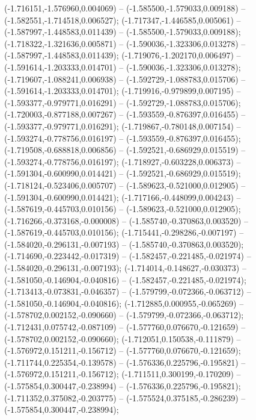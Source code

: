  (-1.716151,-1.576960,0.004069) -- (-1.585500,-1.579033,0.009188) -- (-1.582551,-1.714518,0.006527);
 (-1.717347,-1.446585,0.005061) -- (-1.587997,-1.448583,0.011439) -- (-1.585500,-1.579033,0.009188);
 (-1.718322,-1.321636,0.005871) -- (-1.590036,-1.323306,0.013278) -- (-1.587997,-1.448583,0.011439);
 (-1.719076,-1.202170,0.006497) -- (-1.591614,-1.203333,0.014701) -- (-1.590036,-1.323306,0.013278);
 (-1.719607,-1.088241,0.006938) -- (-1.592729,-1.088783,0.015706) -- (-1.591614,-1.203333,0.014701);
 (-1.719916,-0.979899,0.007195) -- (-1.593377,-0.979771,0.016291) -- (-1.592729,-1.088783,0.015706);
 (-1.720003,-0.877188,0.007267) -- (-1.593559,-0.876397,0.016455) -- (-1.593377,-0.979771,0.016291);
 (-1.719867,-0.780148,0.007154) -- (-1.593274,-0.778756,0.016197) -- (-1.593559,-0.876397,0.016455);
 (-1.719508,-0.688818,0.006856) -- (-1.592521,-0.686929,0.015519) -- (-1.593274,-0.778756,0.016197);
 (-1.718927,-0.603228,0.006373) -- (-1.591304,-0.600990,0.014421) -- (-1.592521,-0.686929,0.015519);
 (-1.718124,-0.523406,0.005707) -- (-1.589623,-0.521000,0.012905) -- (-1.591304,-0.600990,0.014421);
 (-1.717166,-0.448099,0.004243) -- (-1.587619,-0.445703,0.010156) -- (-1.589623,-0.521000,0.012905);
 (-1.716266,-0.373168,-0.000008) -- (-1.585740,-0.370863,0.003520) -- (-1.587619,-0.445703,0.010156);
 (-1.715441,-0.298286,-0.007197) -- (-1.584020,-0.296131,-0.007193) -- (-1.585740,-0.370863,0.003520);
 (-1.714690,-0.223442,-0.017319) -- (-1.582457,-0.221485,-0.021974) -- (-1.584020,-0.296131,-0.007193);
 (-1.714014,-0.148627,-0.030373) -- (-1.581050,-0.146904,-0.040816) -- (-1.582457,-0.221485,-0.021974);
 (-1.713413,-0.073831,-0.046357) -- (-1.579799,-0.072366,-0.063712) -- (-1.581050,-0.146904,-0.040816);
 (-1.712885,0.000955,-0.065269) -- (-1.578702,0.002152,-0.090660) -- (-1.579799,-0.072366,-0.063712);
 (-1.712431,0.075742,-0.087109) -- (-1.577760,0.076670,-0.121659) -- (-1.578702,0.002152,-0.090660);
 (-1.712051,0.150538,-0.111879) -- (-1.576972,0.151211,-0.156712) -- (-1.577760,0.076670,-0.121659);
 (-1.711744,0.225354,-0.139578) -- (-1.576336,0.225796,-0.195821) -- (-1.576972,0.151211,-0.156712);
 (-1.711511,0.300199,-0.170209) -- (-1.575854,0.300447,-0.238994) -- (-1.576336,0.225796,-0.195821);
 (-1.711352,0.375082,-0.203775) -- (-1.575524,0.375185,-0.286239) -- (-1.575854,0.300447,-0.238994);
